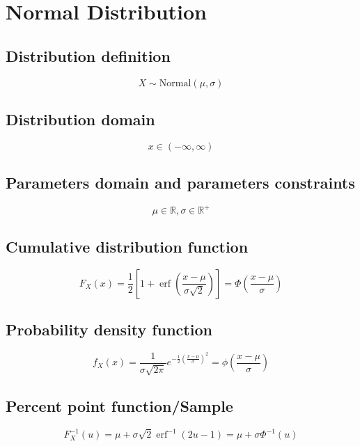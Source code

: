 \documentclass{article}
\begin{document}
\newpage
\section{Normal Distribution}
\subsection{Distribution definition}
\begin{equation*} X\sim\mathrm{Normal}\left(\mu,\sigma\right) \end{equation*}
\subsection{Distribution domain}
\begin{equation*} x\in\left(-\infty,\infty\right) \end{equation*}
\subsection{Parameters domain and parameters constraints}
\begin{equation*} \mu\in\mathbb{R}, \sigma\in\mathbb{R}^{+} \end{equation*}
\subsection{Cumulative distribution function}
\begin{equation*} F_{X}\left(x\right)=\frac{1}{2}\left[1+\operatorname{erf}\left(\frac{x-\mu}{\sigma\sqrt{2}}\right)\right]=\Phi\left(\frac{x-\mu}{\sigma}\right) \end{equation*}
\subsection{Probability density function}
\begin{equation*} f_{X}\left(x\right)=\frac{1}{\sigma\sqrt{2\pi}} e^{-\frac{1}{2}\left(\frac{x-\mu}{\sigma}\right)^2}=\phi\left(\frac{x-\mu}{\sigma}\right) \end{equation*}
\subsection{Percent point function/Sample}
\begin{equation*} F^{-1}_{X}\left(u\right)=\mu+\sigma\sqrt{2} \operatorname{erf}^{-1}(2u-1)=\mu+\sigma\Phi^{-1}\left(u\right) \end{equation*}
\end{document}

